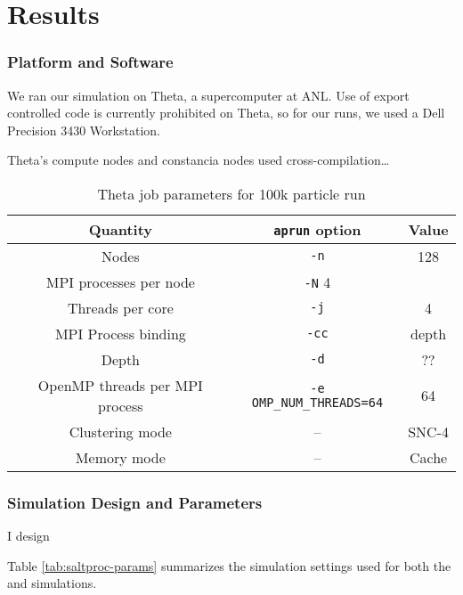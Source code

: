 \chapter{Results}
\label{ch:chapter5}

\subsection{Platform and Software}
\label{sub:platform-software}
We ran our \OpenMC simulation on Theta, a supercomputer at ANL. Use of export
controlled code is currently prohibited on Theta, so for our \SerpentTWO runs,
we used a Dell Precision 3430 Workstation.

Theta's compute nodes and constancia nodes used cross-compilation\ldots

\begin{table}[htpb] 
    \centering 
    \caption{Theta job parameters for 100k particle \OpenMC run}
    \label{tab:theta-params}
    \begin{tabular}{|c|c|c|} 
        \hline
        Quantity & \verb.aprun. option & Value\\
        \hline
        Nodes & \verb.-n. & 128 \\
        \hline
        MPI processes per node & \verb.-N. 4 \\
        \hline
        Threads per core & \verb.-j. & 4 \\
        \hline
        MPI Process binding & \verb.-cc. & depth \\
        \hline
        Depth & \verb.-d. & ?? \\
        \hline
        OpenMP threads per MPI process & \verb.-e OMP_NUM_THREADS=64. & 64 \\
        \hline
        Clustering mode & -- & SNC-4 \\
        \hline
        Memory mode & -- & Cache \\
        \hline
    \end{tabular}
\end{table}

\subsection{Simulation Design and Parameters}
\label{sub:simulation-parameters}

I design


Table \ref{tab:saltproc-params} summarizes the simulation settings used
for both the \SerpentTWO and \OpenMC simulations.
 
